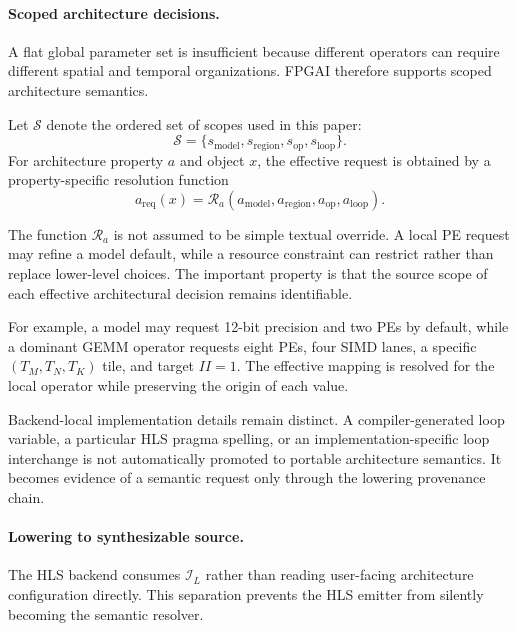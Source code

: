 \documentclass{article}
\begin{document}
\paragraph{Scoped architecture decisions.}
\label{sec:scope}

A flat global parameter set is insufficient because different operators can require different spatial and temporal organizations. FPGAI therefore supports scoped architecture semantics.

Let $\mathcal{S}$ denote the ordered set of scopes used in this paper:
\begin{equation}
\mathcal{S}
=
\{
s_{\mathrm{model}},
s_{\mathrm{region}},
s_{\mathrm{op}},
s_{\mathrm{loop}}
\}.
\label{eq:scopes}
\end{equation}
For architecture property $a$ and object $x$, the effective request is obtained by a property-specific resolution function
\begin{equation}
a_{\mathrm{req}}(x)
=
\mathcal{R}_a
\left(
a_{\mathrm{model}},
a_{\mathrm{region}},
a_{\mathrm{op}},
a_{\mathrm{loop}}
\right).
\label{eq:scope-resolution}
\end{equation}

The function $\mathcal{R}_a$ is not assumed to be simple textual override. A local PE request may refine a model default, while a resource constraint can restrict rather than replace lower-level choices. The important property is that the source scope of each effective architectural decision remains identifiable.

For example, a model may request 12-bit precision and two PEs by default, while a dominant GEMM operator requests eight PEs, four SIMD lanes, a specific $(T_M,T_N,T_K)$ tile, and target $II=1$. The effective mapping is resolved for the local operator while preserving the origin of each value.

Backend-local implementation details remain distinct. A compiler-generated loop variable, a particular HLS pragma spelling, or an implementation-specific loop interchange is not automatically promoted to portable architecture semantics. It becomes evidence of a semantic request only through the lowering provenance chain.

\paragraph{Lowering to synthesizable source.}
\label{sec:hls}

The HLS backend consumes $\mathcal{I}_{L}$ rather than reading user-facing architecture configuration directly. This separation prevents the HLS emitter from silently becoming the semantic resolver.
\end{document}
